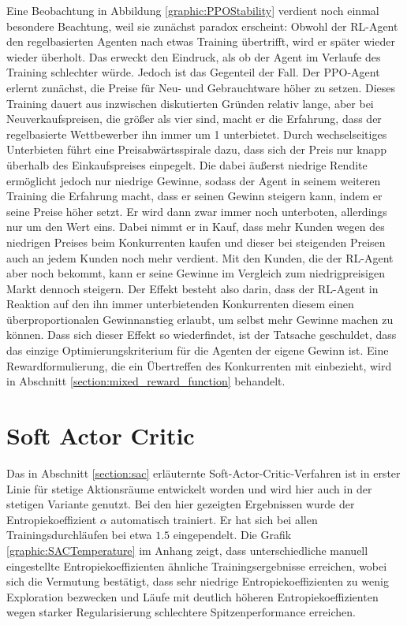 Eine Beobachtung in Abbildung \ref{graphic:PPOStability} verdient noch einmal besondere Beachtung, weil sie zunächst paradox erscheint:
Obwohl der RL-Agent den regelbasierten Agenten nach etwas Training übertrifft, wird er später wieder wieder überholt.
Das erweckt den Eindruck, als ob der Agent im Verlaufe des Training schlechter würde.
Jedoch ist das Gegenteil der Fall.
Der PPO-Agent erlernt zunächst, die Preise für Neu- und Gebrauchtware höher zu setzen.
Dieses Training dauert aus inzwischen diskutierten Gründen relativ lange, aber bei Neuverkaufspreisen, die größer als vier sind, macht er die Erfahrung, dass der regelbasierte Wettbewerber ihn immer um 1 unterbietet.
Durch wechselseitiges Unterbieten führt eine Preisabwärtsspirale dazu, dass sich der Preis nur knapp überhalb des Einkaufspreises einpegelt.
Die dabei äußerst niedrige Rendite ermöglicht jedoch nur niedrige Gewinne, sodass der Agent in seinem weiteren Training die Erfahrung macht, dass er seinen Gewinn steigern kann, indem er seine Preise höher setzt.
Er wird dann zwar immer noch unterboten, allerdings nur um den Wert eins.
Dabei nimmt er in Kauf, dass mehr Kunden wegen des niedrigen Preises beim Konkurrenten kaufen und dieser bei steigenden Preisen auch an jedem Kunden noch mehr verdient.
Mit den Kunden, die der RL-Agent aber noch bekommt, kann er seine Gewinne im Vergleich zum niedrigpreisigen Markt dennoch steigern.
Der Effekt besteht also darin, dass der RL-Agent in Reaktion auf den ihn immer unterbietenden Konkurrenten diesem einen überproportionalen Gewinnanstieg erlaubt, um selbst mehr Gewinne machen zu können.
Dass sich dieser Effekt so wiederfindet, ist der Tatsache geschuldet, dass das einzige Optimierungskriterium für die Agenten der eigene Gewinn ist.
Eine Rewardformulierung, die ein Übertreffen des Konkurrenten mit einbezieht, wird in Abschnitt \ref{section:mixed_reward_function} behandelt.

\section{Soft Actor Critic}
\label{section:main_sac}
Das in Abschnitt \ref{section:sac} erläuternte Soft-Actor-Critic-Verfahren ist in erster Linie für stetige Aktionsräume entwickelt worden und wird hier auch in der stetigen Variante genutzt.
Bei den hier gezeigten Ergebnissen wurde der Entropiekoeffizient $\alpha$ automatisch trainiert.
Er hat sich bei allen Trainingsdurchläufen bei etwa $1.5$ eingependelt.
Die Grafik \ref{graphic:SACTemperature} im Anhang zeigt, dass unterschiedliche manuell eingestellte Entropiekoeffizienten ähnliche Trainingsergebnisse erreichen, wobei sich die Vermutung bestätigt, dass sehr niedrige Entropiekoeffizienten zu wenig Exploration bezwecken und Läufe mit deutlich höheren Entropiekoeffizienten wegen starker Regularisierung schlechtere Spitzenperformance erreichen.

